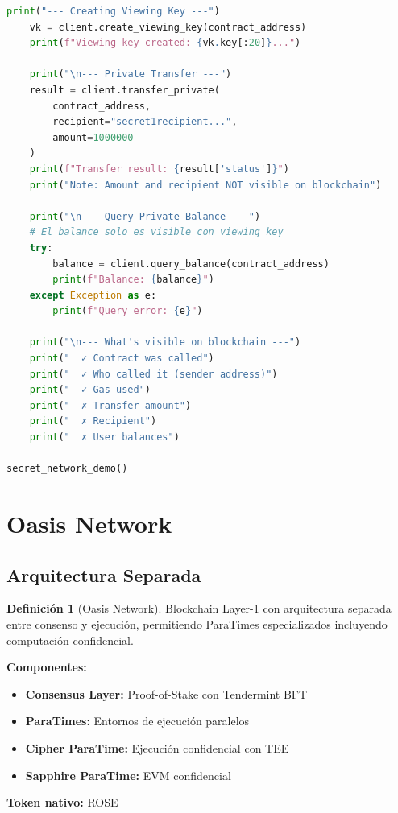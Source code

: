 \documentclass[11pt,a4paper,twoside]{book}
\theoremstyle{definition}
\newtheorem{definition}{Definición}[chapter]
\theoremstyle{remark}
\begin{document}
\begin{lstlisting}[language=Python, caption={Cliente para interactuar con Secret Network}]
    print("--- Creating Viewing Key ---")
    vk = client.create_viewing_key(contract_address)
    print(f"Viewing key created: {vk.key[:20]}...")
    
    print("\n--- Private Transfer ---")
    result = client.transfer_private(
        contract_address,
        recipient="secret1recipient...",
        amount=1000000
    )
    print(f"Transfer result: {result['status']}")
    print("Note: Amount and recipient NOT visible on blockchain")
    
    print("\n--- Query Private Balance ---")
    # El balance solo es visible con viewing key
    try:
        balance = client.query_balance(contract_address)
        print(f"Balance: {balance}")
    except Exception as e:
        print(f"Query error: {e}")
    
    print("\n--- What's visible on blockchain ---")
    print("  ✓ Contract was called")
    print("  ✓ Who called it (sender address)")
    print("  ✓ Gas used")
    print("  ✗ Transfer amount")
    print("  ✗ Recipient")
    print("  ✗ User balances")

secret_network_demo()
\end{lstlisting}

\section{Oasis Network}
\label{sec:oasis-network}

\subsection{Arquitectura Separada}

\begin{definition}[Oasis Network]
Blockchain Layer-1 con arquitectura separada entre consenso y ejecución, permitiendo ParaTimes especializados incluyendo computación confidencial.

\textbf{Componentes:}
\begin{itemize}
    \item \textbf{Consensus Layer:} Proof-of-Stake con Tendermint BFT
    \item \textbf{ParaTimes:} Entornos de ejecución paralelos
    \item \textbf{Cipher ParaTime:} Ejecución confidencial con TEE
    \item \textbf{Sapphire ParaTime:} EVM confidencial
\end{itemize}

\textbf{Token nativo:} ROSE
\end{definition}
\end{document}

